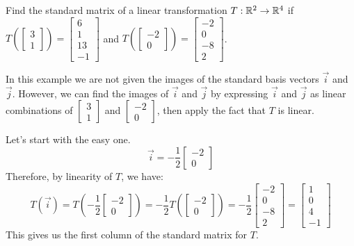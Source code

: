 \documentclass{ximera}
\begin{document}
 \begin{example}\label{ex:transNoStBases}
 Find the standard matrix of a linear transformation $T:\mathbb{R}^2\rightarrow \mathbb{R}^4$ if $T\left(\begin{bmatrix}3\\1\end{bmatrix}\right)=\begin{bmatrix}6\\1\\13\\-1\end{bmatrix}$ and $T\left(\begin{bmatrix}-2\\0\end{bmatrix}\right)=\begin{bmatrix}-2\\0\\-8\\2\end{bmatrix}$.  
\begin{explanation}
In this example we are not given the images of the standard basis vectors $\vec{i}$ and $\vec{j}$.  However, we can find the images of $\vec{i}$ and $\vec{j}$ by expressing $\vec{i}$ and $\vec{j}$ as linear combinations of $\begin{bmatrix}3\\1\end{bmatrix}$ and $\begin{bmatrix}-2\\0\end{bmatrix}$, then apply the fact that $T$ is linear.

Let's start with the easy one.  
$$\vec{i}=-\frac{1}{2}\begin{bmatrix}-2\\0\end{bmatrix}$$
Therefore, by linearity of $T$, we have:
$$T(\vec{i})=T\left(-\frac{1}{2}\begin{bmatrix}-2\\0\end{bmatrix}\right)=-\frac{1}{2}T\left(\begin{bmatrix}-2\\0\end{bmatrix}\right)=-\frac{1}{2}\begin{bmatrix}-2\\0\\-8\\2\end{bmatrix}=\begin{bmatrix}1\\0\\4\\-1\end{bmatrix}$$
This gives us the first column of the standard matrix for $T$.


\end{explanation}
\end{example}
\end{document}
